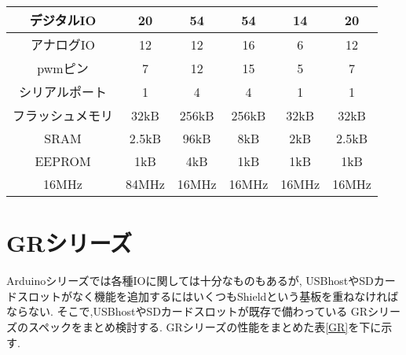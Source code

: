 \documentclass[12pt,oneside]{paper}
\begin{document}
\begin{table}[h]
\begin{center}
{\begin{tabular}[htbp]{|c|c|c|c|c|c|}
  \hline 
  デジタルIO & 20 & 54 & 54 & 14 & 20 \\
  \hline 
  アナログIO & 12 & 12 & 16 & 6 & 12 \\
  \hline
  pwmピン & 7 & 12 & 15 & 5 & 7  \\
  \hline
  シリアルポート & 1 & 4 & 4 & 1 & 1  \\
  \hline 
  フラッシュメモリ & 32kB & 256kB & 256kB & 32kB & 32kB  \\
  \hline
  SRAM & 2.5kB & 96kB & 8kB & 2kB & 2.5kB  \\
  \hline
  EEPROM & 1kB  & 4kB & 1kB & 1kB & 1kB \\
  \hline
  16MHz & 84MHz & 16MHz & 16MHz & 16MHz & 16MHz \\
  \hline
  \end{tabular}
  }
 \end{center}
\end{table}


\section{GRシリーズ}
Arduinoシリーズでは各種IOに関しては十分なものもあるが,
USBhostやSDカードスロットがなく機能を追加するにはいくつもShieldという基板を重ねなければならない.
そこで,USBhostやSDカードスロットが既存で備わっている
GRシリーズのスペックをまとめ検討する.
GRシリーズの性能をまとめた表\ref{GR}を下に示す.
\begin{table}[h]
 \begin{center}
  \label{GR}
  \caption{GRスペック一覧}
 \end{center}
\end{table}
\end{document}

